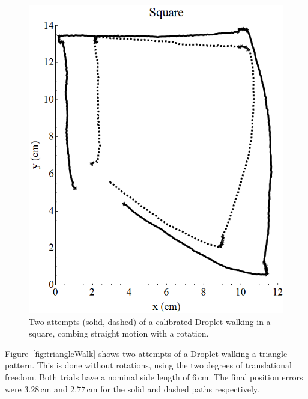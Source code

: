 \documentclass[letterpaper, 10pt, conference]{ieeeconf}
\begin{document}
\begin{figure}[!htb]
\centering
\includegraphics[width=0.9\linewidth]{Images/DropletWalksSquare}
\caption{Two attempts (solid, dashed) of a calibrated Droplet walking in a square, combing straight motion with a rotation.}
\label{fig:squareWalk}
\end{figure}

Figure~\ref{fig:triangleWalk} shows two attempts of a Droplet walking a triangle pattern. This is done without rotations, using the two degrees of translational freedom. Both trials have a nominal side length of $6\,\mathrm{cm}$. The final position errors were $3.28\,\mathrm{cm}$ and $2.77\,\mathrm{cm}$ for the solid and dashed paths respectively.
\end{document}
